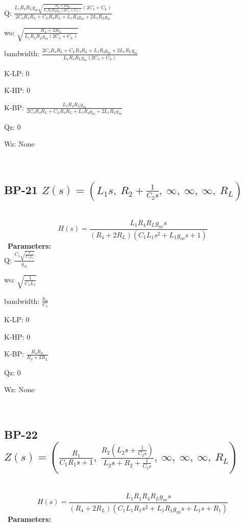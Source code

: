 \documentclass{article}
\begin{document}
Q: $\frac{L_{1} R_{4} R_{L} g_{m} \sqrt{\frac{R_{4} + 2 R_{L}}{L_{1} R_{4} R_{L} g_{m} \left(2 C_{4} + C_{L}\right)}} \left(2 C_{4} + C_{L}\right)}{2 C_{4} R_{4} R_{L} + C_{L} R_{4} R_{L} + L_{1} R_{4} g_{m} + 2 L_{1} R_{L} g_{m}}$\ 

wo: $\sqrt{\frac{R_{4} + 2 R_{L}}{L_{1} R_{4} R_{L} g_{m} \left(2 C_{4} + C_{L}\right)}}$\ 

bandwidth: $\frac{2 C_{4} R_{4} R_{L} + C_{L} R_{4} R_{L} + L_{1} R_{4} g_{m} + 2 L_{1} R_{L} g_{m}}{L_{1} R_{4} R_{L} g_{m} \left(2 C_{4} + C_{L}\right)}$\ 

K-LP: $0$\ 

K-HP: $0$\ 

K-BP: $\frac{L_{1} R_{4} R_{L} g_{m}}{2 C_{4} R_{4} R_{L} + C_{L} R_{4} R_{L} + L_{1} R_{4} g_{m} + 2 L_{1} R_{L} g_{m}}$\ 

Qz: $0$\ 

Wz: $\text{None}$\ 

\ 

\subsection{BP-21 $Z(s) = \left( L_{1} s, \  R_{2} + \frac{1}{C_{2} s}, \  \infty, \  \infty, \  \infty, \  R_{L}\right)$ } \ 
\textbf{\[H(s) = \frac{L_{1} R_{4} R_{L} g_{m} s}{\left(R_{4} + 2 R_{L}\right) \left(C_{1} L_{1} s^{2} + L_{1} g_{m} s + 1\right)}\] } \ 
\textbf{Parameters:}\\ 

Q: $\frac{C_{1} \sqrt{\frac{1}{C_{1} L_{1}}}}{g_{m}}$\ 

wo: $\sqrt{\frac{1}{C_{1} L_{1}}}$\ 

bandwidth: $\frac{g_{m}}{C_{1}}$\ 

K-LP: $0$\ 

K-HP: $0$\ 

K-BP: $\frac{R_{4} R_{L}}{R_{4} + 2 R_{L}}$\ 

Qz: $0$\ 

Wz: $\text{None}$\ 

\ 

\subsection{BP-22 $Z(s) = \left( \frac{R_{1}}{C_{1} R_{1} s + 1}, \  \frac{R_{2} \left(L_{2} s + \frac{1}{C_{2} s}\right)}{L_{2} s + R_{2} + \frac{1}{C_{2} s}}, \  \infty, \  \infty, \  \infty, \  R_{L}\right)$ } \ 
\textbf{\[H(s) = \frac{L_{1} R_{1} R_{4} R_{L} g_{m} s}{\left(R_{4} + 2 R_{L}\right) \left(C_{1} L_{1} R_{1} s^{2} + L_{1} R_{1} g_{m} s + L_{1} s + R_{1}\right)}\] } \ 
\textbf{Parameters:}\\ 
\end{document}
